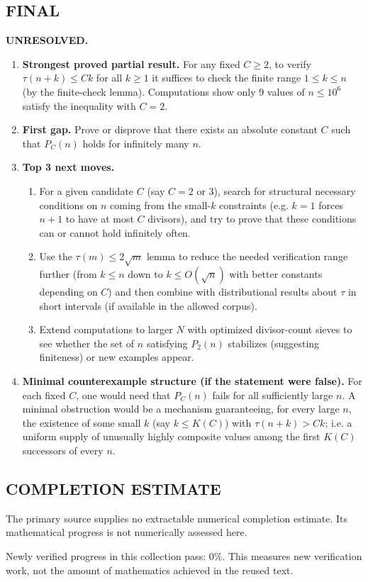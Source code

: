 \subsection*{FINAL}
\textbf{UNRESOLVED.}
\begin{enumerate}
\item[(i)] \textbf{Strongest proved partial result.} For any fixed $C\ge 2$, to verify $\tau(n+k)\le Ck$ for all $k\ge 1$ it suffices to check the finite range $1\le k\le n$ (by the finite-check lemma). Computations show only 9 values of $n\le 10^6$ satisfy the inequality with $C=2$.
\item[(ii)] \textbf{First gap.} Prove or disprove that there exists an absolute constant $C$ such that $P_C(n)$ holds for infinitely many $n$.
\item[(iii)] \textbf{Top 3 next moves.}
  \begin{enumerate}
  \item For a given candidate $C$ (say $C=2$ or $3$), search for structural necessary conditions on $n$ coming from the small-$k$ constraints (e.g. $k=1$ forces $n+1$ to have at most $C$ divisors), and try to prove that these conditions can or cannot hold infinitely often.
  \item Use the $\tau(m)\le 2\sqrt m$ lemma to reduce the needed verification range further (from $k\le n$ down to $k\le O(\sqrt n)$ with better constants depending on $C$) and then combine with distributional results about $\tau$ in short intervals (if available in the allowed corpus).
  \item Extend computations to larger $N$ with optimized divisor-count sieves to see whether the set of $n$ satisfying $P_2(n)$ stabilizes (suggesting finiteness) or new examples appear.
  \end{enumerate}
\item[(iv)] \textbf{Minimal counterexample structure (if the statement were false).} For each fixed $C$, one would need that $P_C(n)$ fails for all sufficiently large $n$. A minimal obstruction would be a mechanism guaranteeing, for every large $n$, the existence of some small $k$ (say $k\le K(C)$) with $\tau(n+k)>Ck$; i.e. a uniform supply of unusually highly composite values among the first $K(C)$ successors of every $n$.
\end{enumerate}




\subsection*{COMPLETION ESTIMATE}
The primary source supplies no extractable numerical completion estimate. Its mathematical progress is not numerically assessed here.

Newly verified progress in this collection pass: $0\%$. This measures new verification work, not the amount of mathematics achieved in the reused text.
